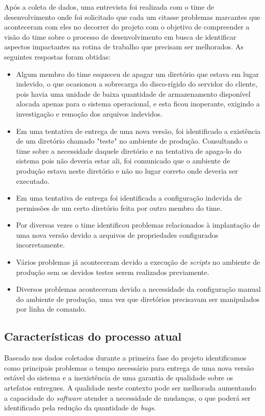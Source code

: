 \documentclass[
	12pt,				%
	openright,			%
	oneside,			%
	a4paper,			%
	english,			%
	french,				%
	spanish,			%
	brazil,				%
	]{abntex2}
\begin{document}
Após a coleta de dados, uma entrevista foi realizada com o time de desenvolvimento onde foi solicitado que cada um citasse problemas marcantes que aconteceram com eles no decorrer do projeto com o objetivo de compreender a visão do time sobre o processo de desenvolvimento em busca de identificar aspectos impactantes na rotina de trabalho que precisam ser melhorados. As seguintes respostas foram obtidas:

\begin{itemize}  
	\item Algum membro do time esqueceu de apagar um diretório que estava em lugar indevido, o que ocasionou a sobrecarga do disco-rígido do servidor do cliente, pois havia uma unidade de baixa quantidade de armazenamento disponível alocada apenas para o sistema operacional, e esta ficou inoperante, exigindo a investigação e remoção dos arquivos indevidos.
	\item Em uma tentativa de entrega de uma nova versão, foi identificado a existência de um diretório chamado "teste" no ambiente de produção. Consultando o time sobre a necessidade daquele diretório e na tentativa de apaga-lo do sistema pois não deveria estar ali, foi comunicado que o ambiente de produção estava neste diretório e não no lugar correto onde deveria ser executado.
	\item Em uma tentativa de entrega foi identificada a configuração indevida de permissões de um certo diretório feita por outro membro do time.
	\item Por diversas vezes o time identificou problemas relacionados à implantação de uma nova versão devido a arquivos de propriedades configurados incorretamente.
	\item Vários problemas já aconteceram devido a execução de \textit{scripts} no ambiente de produção sem os devidos testes serem realizados previamente.
	\item Diversos problemas aconteceram devido a necessidade da configuração manual do ambiente de produção, uma vez que diretórios precisavam ser manipulados por linha de comando.
\end{itemize}

\subsection{Características do processo atual} 

Baseado nos dados coletados durante a primeira fase do projeto identificamos como principais problemas o tempo necessário para entrega de uma nova versão estável do sistema e a inexistência de uma garantia de qualidade sobre os artefatos entregues. A qualidade neste contexto pode ser melhorada aumentando a capacidade do \textit{software} atender a necessidade de mudanças, o que poderá ser identificado pela redução da quantidade de \textit{bugs}.
\end{document}
